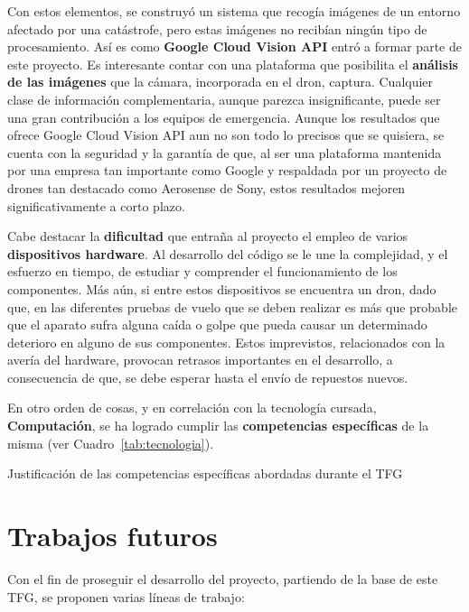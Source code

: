 Con estos elementos, se construyó un sistema que recogía imágenes de un entorno afectado por una catástrofe, pero estas imágenes no recibían ningún tipo de procesamiento. Así es como \textbf{Google Cloud Vision \acs{API}} entró a formar parte de este proyecto. Es interesante contar con una plataforma que posibilita el \textbf{análisis de las imágenes} que la cámara, incorporada en el dron, captura. Cualquier clase de información complementaria, aunque parezca insignificante, puede ser una gran contribución a los equipos de emergencia. Aunque los resultados que ofrece Google Cloud Vision \acs{API} aun no son todo lo precisos que se quisiera, se cuenta con la seguridad y la garantía de que, al ser una plataforma mantenida por una empresa tan importante como Google y respaldada por un proyecto de drones tan destacado como Aerosense de Sony, estos resultados mejoren significativamente a corto plazo.

Cabe destacar la \textbf{dificultad} que entraña al proyecto el empleo de varios \textbf{dispositivos hardware}. Al desarrollo del código se le une la complejidad, y el esfuerzo en tiempo, de estudiar y comprender el funcionamiento de los componentes. Más aún, si entre estos dispositivos se encuentra un dron, dado que, en las diferentes pruebas de vuelo que se deben realizar es más que probable que el aparato sufra alguna caída o golpe que pueda causar un determinado deterioro en alguno de sus componentes. Estos imprevistos, relacionados con la avería del hardware, provocan retrasos importantes en el desarrollo, a consecuencia de que, se debe esperar hasta el envío de repuestos nuevos.

En otro orden de cosas, y en correlación con la tecnología cursada, \textbf{Computación}, se ha logrado cumplir las \textbf{competencias específicas} de la misma (ver Cuadro~\ref{tab:tecnologia}).

\begin{table}[!h]
 \centering
 {\small
 
 }
 \caption[Justificación de las competencias específicas abordadas durante el \acs{TFG}]
 {Justificación de las competencias específicas abordadas durante el \acs{TFG}}
 \label{tab:tecnologia}
\end{table}

\section{Trabajos futuros}
\label{sec:trabajos futuros}

Con el fin de proseguir el desarrollo del proyecto, partiendo de la base de este \acs{TFG}, se proponen varias líneas de trabajo:

